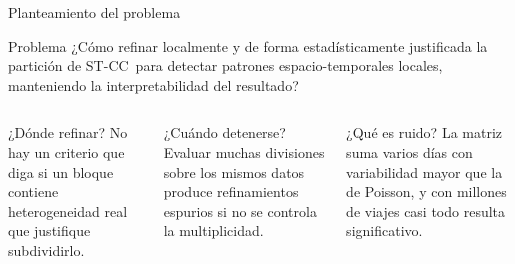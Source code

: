 \documentclass[aspectratio=169,10pt,t]{beamer}
\newcommand{\STCC}{ST-CC}
\begin{document}
\begin{frame}{Planteamiento del problema}
  \begin{block}{Problema}
    ¿Cómo refinar \alert{localmente} y de forma \alert{estadísticamente justificada} la partición de
    \STCC\ para detectar patrones espacio-temporales locales, manteniendo la interpretabilidad del resultado?
  \end{block}
  \vspace{1ex}
  \begin{columns}[T]
    \begin{alertblock}{¿Dónde refinar?}
      \small No hay un criterio que diga si un bloque contiene heterogeneidad real que
      justifique subdividirlo.
    \end{alertblock}
    \begin{alertblock}{¿Cuándo detenerse?}
      \small Evaluar muchas divisiones sobre los mismos datos produce refinamientos
      espurios si no se controla la multiplicidad.
    \end{alertblock}
    \begin{alertblock}{¿Qué es ruido?}
      \small La matriz suma varios días con variabilidad mayor que la de Poisson, y con millones
      de viajes casi todo resulta significativo.
    \end{alertblock}
  \end{columns}
\end{frame}
\end{document}
